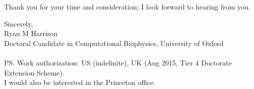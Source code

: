 \documentclass[a4paper]{../res}
\begin{document}
\begin{sloppypar}
\begin{resume}


Thank you for your time and consideration; I look forward to hearing from you.

Sincerely,
\\
Ryan M Harrison \\
Doctoral Candidate in Computational Biophysics, University of Oxford \\  \\
PS. Work authorization: US (indefinite), UK (Aug 2015, Tier 4 Doctorate Extension Scheme). \\ I would also be interested in the Princeton office.

\end{resume} 
\end{sloppypar}
\end{document}
